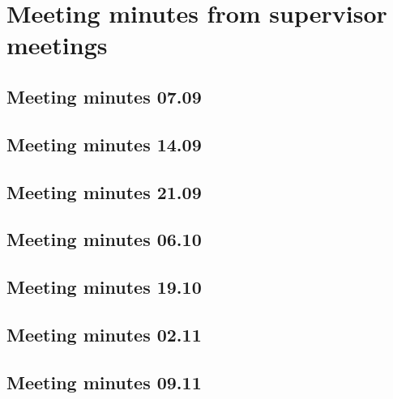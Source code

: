 \chapter{Meeting minutes from supervisor meetings}
\label{app:super-minutes}

\section{Meeting minutes 07.09}
\label{app:super-minutes-1}


\newpage
\section{Meeting minutes 14.09}
\label{app:super-minutes-2}


\section{Meeting minutes 21.09}
\label{app:super-minutes-3}


\section{Meeting minutes 06.10}
\label{app:super-minutes-4}


\section{Meeting minutes 19.10}
\label{app:super-minutes-5}


\section{Meeting minutes 02.11}
\label{app:super-minutes-6}


\section{Meeting minutes 09.11}
\label{app:super-minutes-7}
